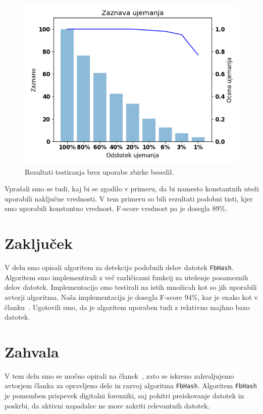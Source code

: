 \documentclass{acm_proc_article-sp}
\begin{document}
\begin{figure}[htb]
\begin{center}
\includegraphics[width=1\columnwidth]{brez_courpusa.png}
\end{center}
\caption{\small{Rezultati testiranja brez uporabe zbirke besedil.}}
\label{fig:brezZbirke}
\end{figure}

\FloatBarrier
 
Vprašali smo se tudi, kaj bi se zgodilo v primeru, da bi namesto konstantnih uteži uporabili naključne vrednosti. V tem primeru so bili rezultati podobni tisti, kjer smo uporabili konstantno vrednost, F-score vrednost pa je dosegla 89\%.


\section{Zaklju\v{c}ek}
V delu smo opisali algoritem za detekcijo podobnih delov datotek \texttt{FbHash}. Algoritem smo implementirali z več različicami funkcij za uteženje posameznih delov datotek. Implementacijo smo testirali na istih množicah kot so jih uporabili avtorji algoritma. Naša implementacija je dosegla F-score 94\%, kar je enako kot v članku~\cite{fbhash}. Ugotovili smo, da je algoritem uporaben tudi z relativno majhno bazo datotek.
\\
\section{Zahvala}
V tem delu smo se močno opirali na članek~\cite{fbhash}, zato se iskreno zahvaljujemo avtorjem članka za opravljeno delo in razvoj algoritma \texttt{FbHash}. Algoritem \texttt{FbHash} je pomemben prispevek digitalni forenziki, saj pohitri preiskovanje datotek in poskrbi, da aktivni napadalec ne more zakriti relevantnih datotek.




\balancecolumns
\end{document}
